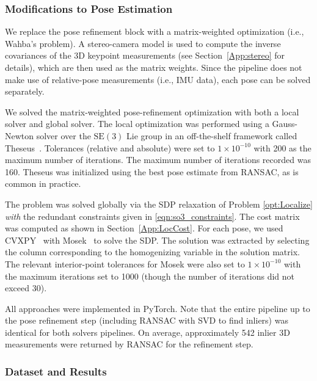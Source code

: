 \documentclass[lettersize,journal]{IEEEtran}
\begin{document}
\subsubsection{Modifications to Pose Estimation}

We replace the pose refinement block with a matrix-weighted optimization (i.e., Wahba's problem). A stereo-camera model is used to compute the inverse covariances of the 3D keypoint measurements (see Section~\ref{App:stereo} for details), which are then used as the matrix weights. Since the pipeline does not make use of relative-pose measurements (i.e., IMU data), each pose can be solved separately. 

We solved the matrix-weighted pose-refinement optimization with both a local solver and global solver. The local optimization was performed using a Gauss-Newton solver over the $\mbox{SE}(3)$ Lie group in an off-the-shelf framework called Theseus~\cite{pinedaTheseusLibraryDifferentiable2022}. Tolerances (relative and absolute) were set to $1\times10^{-10}$ with 200 as the maximum number of iterations. The maximum number of iterations recorded was 160. Theseus was initialized using the best pose estimate from RANSAC, as is common in practice.

The problem was solved globally via the SDP relaxation of Problem \eqref{opt:Localize} \emph{with} the redundant constraints given in \eqref{eqn:so3_constraints}. The cost matrix was computed as shown in Section~\ref{App:LocCost}. For each pose, we used CVXPY~\cite{diamondCVXPYPythonEmbeddedModeling} with Mosek~\cite{mosek} to solve the SDP. The solution was extracted by selecting the column corresponding to the homogenizing variable in the solution matrix. The relevant interior-point tolerances for Mosek were also set to $1\times10^{-10}$ with the maximum iterations set to 1000 (though the number of iterations did not exceed 30).

All approaches were implemented in PyTorch. Note that the entire pipeline up to the pose refinement step (including RANSAC with SVD to find inliers) was identical for both solvers pipelines. On average, approximately 542 inlier 3D measurements were returned by RANSAC for the refinement step.  

\subsubsection{Dataset and Results}
\end{document}
